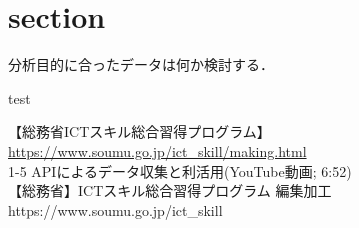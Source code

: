 \newcommand{\Draft}{}
\newcommand{\Slide}{}
\newcommand{\PrintLecture}{1}
\newcommand{\PrintSolution}{1}








\maketitle

\MyFrame{}{\tableofcontents}

\section{section}

\MyFrame{}
{
  分析目的に合ったデータは何か検討する．
}

{
  test
}


{
  【総務省ICTスキル総合習得プログラム】\\
  \url{https://www.soumu.go.jp/ict_skill/making.html}\\
  1-5 APIによるデータ収集と利活用(YouTube動画; 6:52)\\
  \vfill
  \MyRef
  {【総務省】ICTスキル総合習得プログラム 編集加工}
  {https://www.soumu.go.jp/ict_skill}
}


